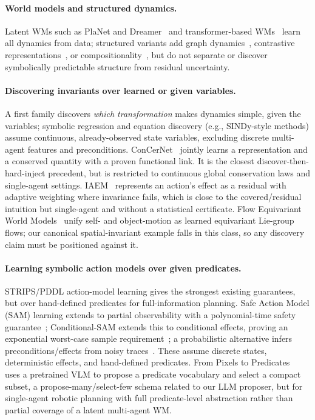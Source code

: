 \documentclass[letterpaper]{article} %
\theoremstyle{plain}
\theoremstyle{definition}
\theoremstyle{remark}
\begin{document}
\paragraph{World models and structured dynamics.} Latent WMs such as PlaNet and Dreamer~\cite{hafner2018planet,hafner2019dreamer,hafner2020dreamerv2,hafner2023dreamerv3} and transformer-based WMs~\cite{chen2022transdreamer,micheli2023transformers} learn all dynamics from data; structured variants add graph dynamics~\cite{zhang2021worldmodelgraph}, contrastive representations~\cite{kipf2020contrastivelearningstructuredworld}, or compositionality~\cite{zhang2024combo}, but do not separate or discover symbolically predictable structure from residual uncertainty.

\paragraph{Discovering invariants over learned or given variables.} A first family discovers \emph{which transformation} makes dynamics simple, given the variables; symbolic regression and equation discovery (e.g., SINDy-style methods) assume continuous, already-observed state variables, excluding discrete multi-agent features and preconditions. ConCerNet~\cite{zhang2023concernet} jointly learns a representation and a conserved quantity with a proven functional link. It is the closest discover-then-hard-inject precedent, but is restricted to continuous global conservation laws and single-agent settings. IAEM~\cite{zhu2022iaem} represents an action's effect as a residual with adaptive weighting where invariance fails, which is close to the covered/residual intuition but single-agent and without a statistical certificate. Flow Equivariant World Models~\cite{lillemark2026flowm} unify self- and object-motion as learned equivariant Lie-group flows; our canonical spatial-invariant example falls in this class, so any discovery claim must be positioned against it.

\paragraph{Learning symbolic action models over given predicates.} STRIPS/PDDL action-model learning gives the strongest existing guarantees, but over hand-defined predicates for full-information planning. Safe Action Model (SAM) learning extends to partial observability with a polynomial-time safety guarantee~\cite{lehiu2024safeactionmodelspo}; Conditional-SAM extends this to conditional effects, proving an exponential worst-case sample requirement~\cite{mordoch2024conditionalsam}; a probabilistic alternative infers preconditions/effects from noisy traces~\cite{lamanna2024nolam}. These assume discrete states, deterministic effects, and hand-defined predicates. From Pixels to Predicates~\cite{athalye2026pixelstopredicates} uses a pretrained VLM to propose a predicate vocabulary and select a compact subset, a propose-many/select-few schema related to our LLM proposer, but for single-agent robotic planning with full predicate-level abstraction rather than partial coverage of a latent multi-agent WM.
\end{document}
